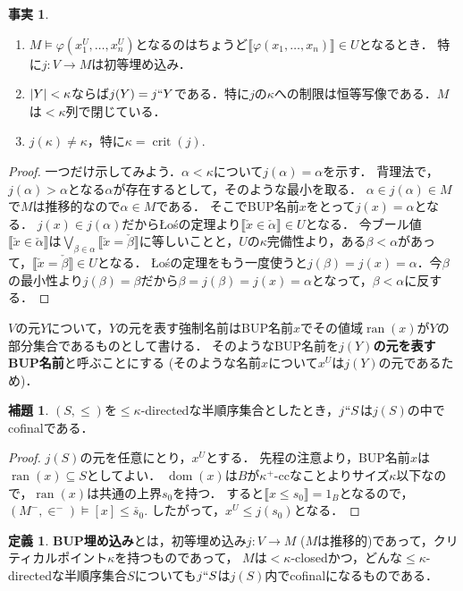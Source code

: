 \documentclass[uplatex,dvipdfmx]{jsarticle}
\newcommand{\range}{\operatorname{ran}}
\newcommand{\dom}{\operatorname{dom}}
\newcommand{\crit}{\operatorname{crit}}
\DeclarePairedDelimiter\abs{\lvert}{\rvert}
\newcommand{\truth}[1]{\llbracket #1 \rrbracket}
\renewcommand\subset{\subseteq}
\theoremstyle{definition}
\newtheorem{defi}[thm]{定義}
\newtheorem{lem}[thm]{補題}
\newtheorem{fact}[thm]{事実}
\begin{document}
	\begin{fact}
	\begin{enumerate}
		\item $M \models \varphi(x_1^U, \dots, x_n^U)$となるのはちょうど$\truth{\varphi(x_1, \dots, x_n)} \in U$となるとき．
		特に$j \colon V \to M$は初等埋め込み．
		\item $\abs{Y} < \kappa$ならば$j(Y) = j``Y$である．特に$j$の$\kappa$への制限は恒等写像である．$M$は${<}\kappa$列で閉じている．
		\item $j(\kappa) \ne \kappa$，特に$\kappa = \crit(j)$.
	\end{enumerate}
	\end{fact}
	\begin{proof}
		一つだけ示してみよう．$\alpha < \kappa$について$j(\alpha) = \alpha$を示す．
		背理法で，$j(\alpha) > \alpha$となる$\alpha$が存在するとして，そのような最小を取る．
		$\alpha \in j(\alpha) \in M$で$M$は推移的なので$\alpha \in M$である．
		そこでBUP名前$x$をとって$j(x) = \alpha$となる．
		$j(x) \in j(\alpha)$だからŁośの定理より$\truth{\check{x} \in \check{\alpha}} \in U$となる．
		今ブール値$\truth{\check{x} \in \check{\alpha}}$は$\bigvee_{\beta \in \alpha} \truth{\check{x} = \check{\beta}}$に等しいことと，$U$の$\kappa$完備性より，ある$\beta < \alpha$があって，$\truth{\check{x} = \check{\beta}} \in U$となる．
		Łośの定理をもう一度使うと$j(\beta) = j(x) = \alpha$．今$\beta$の最小性より$j(\beta) = \beta$だから$\beta = j(\beta) = j(x) = \alpha$となって，$\beta < \alpha$に反する．
	\end{proof}

	$V$の元$Y$について，$Y$の元を表す強制名前はBUP名前$x$でその値域$\range(x)$が$Y$の部分集合であるものとして書ける．
	そのようなBUP名前を\textbf{$j(Y)$の元を表すBUP名前}と呼ぶことにする (そのような名前$x$について$x^U$は$j(Y)$の元であるため)．

	\begin{lem}
		$(S, \le)$を${\le} \kappa$-directedな半順序集合としたとき，$j``S$は$j(S)$の中でcofinalである．
	\end{lem}
	\begin{proof}
		$j(S)$の元を任意にとり，$x^U$とする．
		先程の注意より，BUP名前$x$は$\range(x) \subset S$としてよい．
		$\dom(x)$は$B$が$\kappa^+$-ccなことよりサイズ$\kappa$以下なので，$\range(x)$は共通の上界$s_0$を持つ．
		すると$\truth{x \le s_0} = 1_B$となるので，$(M^-, \in^-) \models [x] \le \check{s_0}$.
		したがって，$x^U \le j(s_0)$となる．
	\end{proof}

	\begin{defi}
		\textbf{BUP埋め込み}とは，初等埋め込み$j \colon V \to M$ ($M$は推移的)であって，クリティカルポイント$\kappa$を持つものであって，
		$M$は${<}\kappa$-closedかつ，どんな${\le}\kappa$-directedな半順序集合$S$についても$j``S$は$j(S)$内でcofinalになるものである．
	\end{defi}
\end{document}
